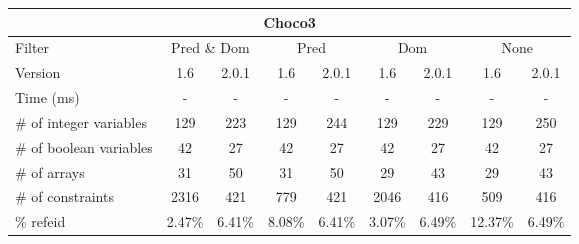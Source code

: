 \documentclass{standalone}
\begin{document}
\begin{table}[H]
\footnotesize
\begin{tabular}{lc|c|c|c|c|c|c|c}
\multicolumn{9}{c}{Choco3} \\ 
\hline\hline Filter & \multicolumn{2}{c|}{Pred \& Dom} &\multicolumn{2}{c|}{Pred}  & \multicolumn{2}{c|}{Dom} & \multicolumn{2}{c}{None} \\ 
\hline Version & 1.6 & 2.0.1 & 1.6 & 2.0.1 & 1.6 & 2.0.1 & 1.6 & 2.0.1 \\ 
Time (ms)               & - & - & - & - & - & - & - & - \\ 
\# of integer variables & 129 & 223 & 129 & 244 & 129 & 229 & 129 & 250 \\ 
\# of boolean variables & 42 & 27 & 42 & 27 & 42 & 27 & 42 & 27 \\ 
\# of arrays            & 31 & 50 & 31 & 50 & 29 & 43 & 29 & 43 \\ 
\# of constraints       & 2316 & 421 & 779 & 421 & 2046 & 416 & 509 & 416 \\ 
\% refeid               & 2.47\% & 6.41\% & 8.08\% & 6.41\% & 3.07\% & 6.49\% & 12.37\% & 6.49\% \\ 
\end{tabular} 
\end{table}
\end{document}
